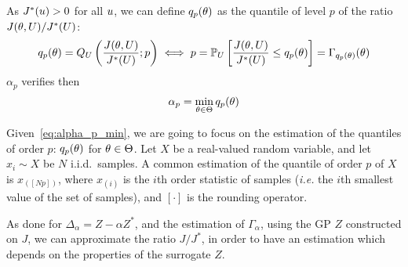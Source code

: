 \documentclass[../../Main_ManuscritThese.tex]{subfiles}
\begin{document}
As $J^*(u) > 0$ for all $u$, we can define $q_{p}(\theta)$ as the quantile of level $p$ of the ratio $J(\theta, U) / J^*(U)$:
\begin{align}
       q_{p}(\theta)= Q_{U}\left(\frac{J(\theta, U)}{J^*(U)};p\right) \iff  p  = \mathbb{P}_{U}\left[\frac{J(\theta, U)}{J^*(U)} \leq q_{p}(\theta)\right] = \Gamma_{q_p(\theta)}(\theta)
\end{align}
$\alpha_p$ verifies then
\begin{equation}
  \label{eq:alpha_p_min}
\alpha_p = \min_{\theta\in\Theta} q_p(\theta)
\end{equation}

Given~\cref{eq:alpha_p_min}, we are going to focus on the estimation
of the quantiles of order $p$: $q_p(\theta)$ for $\theta \in \Theta$.  Let
$X$ be a real-valued random variable, and let $x_i \sim X$ be $N$
i.i.d.\ samples.  A common estimation of the quantile of order $p$ of
$X$ is $x_{(\left[Np\right])}$, where $x_{(i)}$ is the $i$th order
statistic of samples (\emph{i.e.} the $i$th smallest value of the set
of samples), and $[\cdot]$ is the rounding operator.

As done for $\Delta_{\alpha} = Z - \alpha Z^*$, and the estimation of
$\Gamma_{\alpha}$, using the GP $Z$ constructed on $J$, we can
approximate the ratio $J/J^*$, in order to have an estimation which
depends on the properties of the surrogate $Z$.
\end{document}
